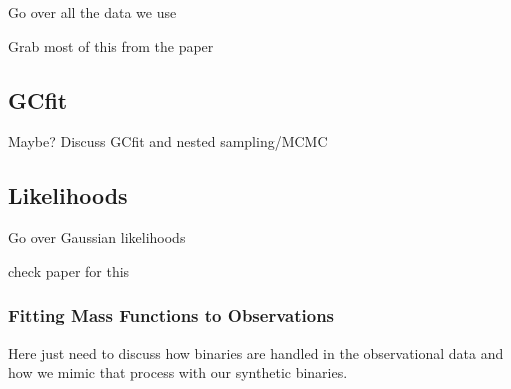 Go over all the data we use

Grab most of this from the paper

\subsection{GCfit}

Maybe? Discuss GCfit and nested sampling/MCMC


\subsection{Likelihoods}

Go over Gaussian likelihoods

check paper for this

\subsubsection{Fitting Mass Functions to Observations}


Here just need to discuss how binaries are handled in the observational data and how we mimic that
process with our synthetic binaries.